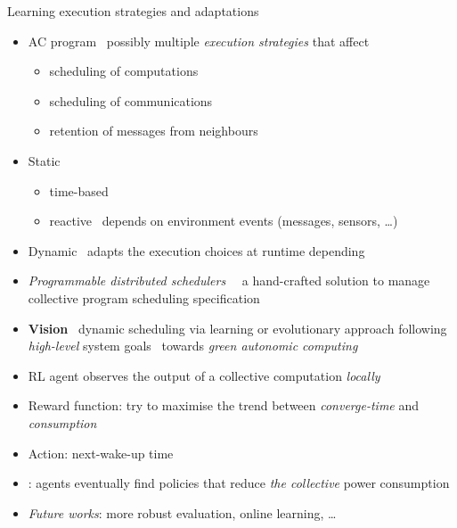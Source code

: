 \documentclass[8pt, aspectratio=169, handout]{beamer}
\begin{document}
\begin{frame}[allowframebreaks]{Learning execution strategies and adaptations}
  \begin{cardTiny}
    \begin{itemize}
    \item AC program \faArrowRight \, possibly multiple \emph{execution strategies} that affect
    \begin{itemize}
      \item scheduling of computations
      \item scheduling of communications
      \item retention of messages from neighbours
    \end{itemize}
    \end{itemize}
  \end{cardTiny}
  \begin{card}
    \begin{itemize}
      \item Static
      \begin{itemize}
        \item time-based
        \item reactive \faArrowRight \, depends on environment events (messages, sensors, \dots)
      \end{itemize}
      \item Dynamic \faArrowRight \,  adapts the execution choices at
      runtime depending
      \item \emph{Programmable distributed schedulers}~\cite{danilo2021lmcs} \faArrowRight \, a hand-crafted solution to manage collective program scheduling specification
      \item \textbf{Vision} \faArrowRight \, dynamic scheduling via learning or evolutionary approach following \emph{high-level} system goals \faArrowRight\, towards \emph{green autonomic computing}
    \end{itemize}
  \end{card}
  \begin{card}
    \begin{itemize}
      \item RL agent observes the output of a collective computation \emph{locally}
      \item Reward function: try to maximise the trend between \emph{converge-time} and \emph{consumption}
      \item Action: next-wake-up time
      \item {}: agents eventually find policies that reduce \emph{the collective} power consumption
      \item \emph{Future works}: more robust evaluation, online learning, \dots
    \end{itemize}
  \end{card}
\end{frame}
\end{document}
